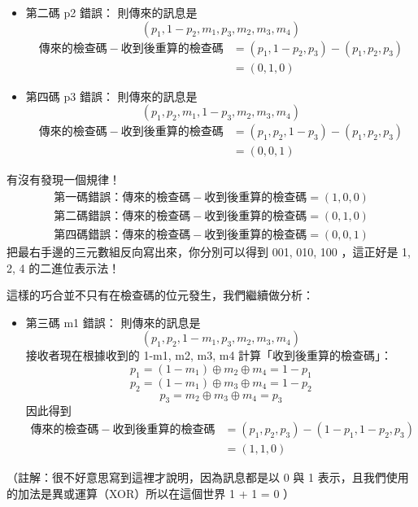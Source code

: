 \documentclass[
]{article}
\providecommand{\tightlist}{%
  \setlength{\itemsep}{0pt}\setlength{\parskip}{0pt}}
\begin{document}
\begin{itemize}
\item
  第二碼 p2 錯誤： 則傳來的訊息是 \[
  (p_{1},1-p_{2},m_{1},p_{3},m_{2},m_{3},m_{4})
  \] \[
  \begin{aligned}
  傳來的檢查碼 - 收到後重算的檢查碼 &= (p_{1},1-p_{2},p_{3}) - (p_{1},p_{2},p_{3}) \\
  &= (0,1,0)
  \end{aligned}
  \]
\item
  第四碼 p3 錯誤： 則傳來的訊息是 \[
  (p_{1},p_{2},m_{1},1-p_{3},m_{2},m_{3},m_{4})
  \] \[
  \begin{aligned}
  傳來的檢查碼 - 收到後重算的檢查碼 &= (p_{1},p_{2},1-p_{3}) - (p_{1},p_{2},p_{3}) \\
  &= (0,0,1)
  \end{aligned}
  \]
\end{itemize}

有沒有發現一個規律！ \[
\begin{aligned}
第一碼錯誤：傳來的檢查碼-收到後重算的檢查碼 = (1,0,0)\\
第二碼錯誤：傳來的檢查碼-收到後重算的檢查碼 = (0,1,0)\\
第四碼錯誤：傳來的檢查碼-收到後重算的檢查碼 = (0,0,1)
\end{aligned}
\] 把最右手邊的三元數組反向寫出來，你分別可以得到 001, 010, 100
，這正好是 1, 2, 4 的二進位表示法！

這樣的巧合並不只有在檢查碼的位元發生，我們繼續做分析：

\begin{itemize}
\tightlist
\item
  第三碼 m1 錯誤： 則傳來的訊息是 \[
  (p_{1},p_{2},1-m_{1},p_{3},m_{2},m_{3},m_{4})
  \] 接收者現在根據收到的 1-m1, m2, m3, m4 計算「收到後重算的檢查碼」：
  \[
  p_{1} = (1-m_{1})\oplus m_{2}\oplus m_{4}
  = 1-p_{1}
  \] \[
  p_{2} = (1-m_{1})\oplus m_{3}\oplus m_{4}=1-p_{2}
  \] \[
  p_{3} = m_{2}\oplus m_{3}\oplus m_{4}=p_{3}
  \] 因此得到 \[
  \begin{aligned}
  傳來的檢查碼 - 收到後重算的檢查碼 &= (p_{1},p_{2},p_{3}) - (1-p_{1},1-p_{2},p_{3}) \\
  &= (1,1,0)
  \end{aligned}
  \]
\end{itemize}

（註解：很不好意思寫到這裡才說明，因為訊息都是以 0 與 1
表示，且我們使用的加法是異或運算（XOR）所以在這個世界 1 + 1 = 0 ）
\end{document}
